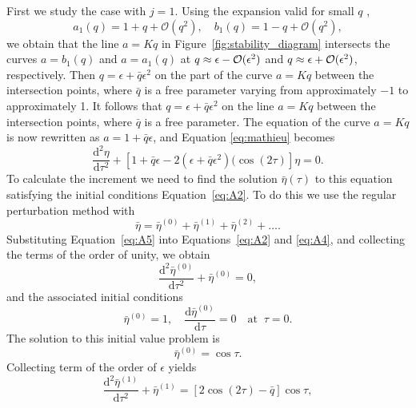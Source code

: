 \documentclass[12pt]{ociamthesis}
\begin{document}
First we study the case with $j = 1$. Using the expansion valid for small $q$ \citep{Abramowitz1965},
%
\begin{equation}
\label{eq:A3}
a_1(q) = 1 + q + \mathcal{O}(q^2), \quad b_1(q) = 1 - q + \mathcal{O}(q^2),
\end{equation}
%
we obtain that the line $a = Kq$ in Figure~\ref{fig:stability_diagram} intersects the curves $a = b_1(q)$ and $a = a_1(q)$ at $q \approx \epsilon - {\cal O}(\epsilon^2)$ and $q \approx \epsilon + {\cal O}(\epsilon^2)$, respectively.
Then $q = \epsilon + \bar q\epsilon^2$ on the part of the curve $a = Kq$ between the intersection points, where $\bar q$ is a free parameter varying from approximately $-1$ to approximately 1.
It follows that $q = \epsilon + \bar q \epsilon^2$ on the line $a = K q$ between the intersection points, where $\bar q$ is a free parameter.
The equation of the curve $a = Kq$ is now rewritten as $a = 1 + \bar q\epsilon$\/, and Equation \eqref{eq:mathieu} becomes
%
\begin{equation}
\frac{\mathrm{d}^2 \eta}{\mathrm{d}\tau^2} + [1 + \bar q\epsilon
- 2(\epsilon + \bar q\epsilon^2)(\cos(2 \tau)] \eta = 0.
\label{eq:A4} 
\end{equation}
%
To calculate the increment we need to find the solution $\bar\eta(\tau)$ to this equation satisfying the initial conditions Equation~\eqref{eq:A2}.
To do this we use the regular perturbation method with
%
\begin{equation}
\bar\eta = \bar\eta^{(0)} + \bar\eta^{(1)} + \bar\eta^{(2)} + \dots.
\label{eq:A5} 
\end{equation}
%
Substituting Equation~\eqref{eq:A5} into Equations~\eqref{eq:A2} and \eqref{eq:A4}, and collecting the terms of the order of unity, we obtain
%
\begin{equation}
\frac{\mathrm{d}^2\bar\eta^{(0)}}{\mathrm{d}\tau^2} + \bar\eta^{(0)} = 0,
\label{eq:A6} 
\end{equation}
%
and the associated initial conditions
%
\begin{equation}
\bar\eta^{(0)} = 1, \quad \frac{\mathrm{d} \bar\eta^{(0)}}{\mathrm{d} \tau} = 0
\quad \mbox{at} \;\; \tau = 0.
\label{eq:A7} 
\end{equation}
%
The solution to this initial value problem is
% 
\begin{equation}
\bar\eta^{(0)} = \cos\tau.
\label{eq:A8}
\end{equation}
%
Collecting term of the order of $\epsilon$ yields
%
\begin{equation}
\frac{\mathrm{d}^2\bar\eta^{(1)}}{\mathrm{d}\tau^2} + \bar\eta^{(1)} = 
   [2\cos(2\tau) - \bar q]\cos\tau ,
\label{eq:A9} 
\end{equation}
\end{document}
